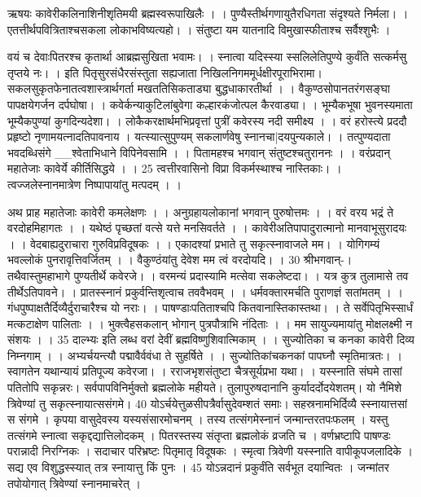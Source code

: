 ऋषयः
कावेरीकलिनाशिनीशृतिमयी ब्रह्मस्वरूपाखिलैः ।
।
 पुण्यैस्तीर्थगणायुतैरधिगता संदृश्यते निर्मला।
 ।
 एतत्तीर्थपवित्रिताश्चसकला लोकाभविष्यत्यहो।
 ।
 संतुष्टा यम यातनादि विमुखास्फीताश्च सर्वैश्शुभैः ।
 
वयं च देवाःपितरश्च कृतार्था आब्रह्मसुखिता भवामः।
।
 स्नात्वा यदिस्स्या स्सलिलेतिपुण्ये
कुर्वंति सत्कर्मसु तृप्तये नः।
।
 इति पितृसुरसंधैरसंस्तुता सह्यजाता
निखिलनिगममूर्धक्षीरपूराभिरामा।
 सकलसुकृतफेनातत्वशास्त्रार्थगर्ता
मखततिसिकताड्या बुद्धधाकारतीर्था ।
।
 वैकुण्ठसोपानतरंगसङ्घा पापक्षयेगर्जन दर्पघोषा।
 ।
 कवेर्कन्याकुटिलांबुवेगा
कल्हारकंजोत्पल कैरवाड्या।
।
 भूम्यैकभूषा भुवनस्यमाता
भूम्यैकपुण्यां कुगदिन्यदेशा।
।
 लोकैकरक्षार्थमभिप्रवृत्तां पुत्रीं कवेरस्य नदी समीक्ष्य ।
 ।
 वरं हरोस्त्ये प्रददौ प्रहृष्टो नृणामयत्नादतिपावनाय ।
 यत्स्यात्सुपुण्यम्
सकलार्णवेषु स्नानचा|दयपुन्यकाले।
।
 तत्पुण्यदाता भवदब्धिसंगे
__श्वेताभिधाने विपिनेवसामि ।
।
 पितामहश्च भगवान् संतुष्टश्चतुराननः ।
 ।
 वरंप्रदान् महातेजाः कावेर्ये कीर्तिसिद्धये ।
 ।
 25 त्वत्तीरवासिनो विप्रा विकर्मस्थाश्च नास्तिकाः।
 ।
 त्वज्जलेस्नानमात्रेण निष्पापायांतु मत्पदम् ।
 ।

अथ प्राह महातेजाः कावेरी कमलेक्षणः ।
।
 अनुग्रहायलोकानां भगवान् पुरुषोत्तमः ।
 ।
 वरं वरय भद्रं ते वरदोहमिहागतः ।
 ।
 यथेष्ठं पृच्छतां वत्से यत्ते मनसिवर्तते ।
 ।
 कावेरीअतिपापादुरात्मानो मानवाभूसुरादयः ।
 ।
 वेदबाह्यदुराचारा गुरुविप्रविदूषकः ।
 ।
 एकादश्यां प्रभाते तु सकृत्स्नावाजले मम।
 ।
 योगिगम्यं भवल्लोकं पुनरावृत्तिवर्जितम् ।
 ।
 वैकुण्ठंयांतु देवेश मम त्वं वरदोयदि।
 ।
 30 श्रीभगवान्-।
 तथैवास्तुमहाभागे पुण्यतीर्थे कवेरजे।
 ।
 वरमन्यं प्रदास्यामि मत्सेवा सकलेष्टदा।
 ।
 यत्र कुत्र तुलामासे तव तीर्थेऽतिपावने।
 ।
 प्रातस्स्नानं प्रकुर्वन्तिशृत्वाच तववैभवम् ।
 ।
 धर्मवक्तारमर्चति पुराणज्ञं सतांमतम् ।
 ।
 गंधपुष्पाक्षतैर्दिव्यैर्दुराचारैश्च यो नराः।
 ।
 पाषण्डाःपतिताश्चपि कितवानास्तिकास्तथा।
 ।
 ते सर्वेपितृभिस्सार्धं मत्कटाक्षेण पालिताः ।
 ।
 भुक्त्वैहसकलान् भोगान् पुत्रपौत्राभि नंदिताः ।
 ।
 मम सायुज्यमायांतु मोक्षलक्ष्मी न संशयः ।
 ।
 35 दाल्भ्यः
इति लब्ध वरां देवीं ब्रह्मविष्णुशिवात्मिकाम् ।
।
 सुज्योतिका च कनका कावेरी दिव्य निम्नगाम् ।
 ।
 अभ्यर्चयन्त्यौ पद्मावैर्ववंधा ते सुहर्षिते ।
 ।
 सुज्योतिकांचकनकां पापघ्नौ स्मृतिमात्रतः।
 ।
 स्वागतेन यथान्यायं प्रतिपूज्य कवेरजा।
 ।
 रराजभृशसंतुष्टा चैत्रसूर्यप्रभा यथा।
 ।
 यस्स्नाति संघमे तासां पतितोपि सकृन्नरः।
 सर्वपापविनिर्मुक्तो ब्रह्मलोके महीयते।
 तुलापुरुषदानानि कुर्यादर्दोदयेशतम्।
 यो नैमिशे त्रिवेण्यां तु सकृत्स्नायात्ससंगमे।
 40 योऽर्चयेत्तुळसीपत्रैर्वासुदेवम्शतं समाः।
 सहस्रनामभिर्दिव्यै स्स्नायात्तसां स संगमे ।
 कृपया वासुदेवस्य यस्यसंसारमोचनम् ।
 तस्य तत्संगमेस्नानं जन्मान्तरतपःफलम् ।
 यस्तु तत्संगमे स्नात्वा सकृद्दद्यात्तिलोदकम् ।
 पितरस्तस्य संतृप्ता ब्रह्मलोकं व्रजति च ।
 वर्णभ्रष्टापि पाषण्डः परान्नादी निरग्निकः ।
 सदाचार परिभ्रष्टः पितृमातृ विदूषकः ।
 स्मृत्वा त्रिवेणी यस्स्नाति वापीकूपजलादिके ।
 सद्य एव विशुद्धस्स्यात् तत्र स्नायात्तु किं पुनः ।
 45 योऽन्नदानं प्रकुर्वंति सर्वभूत दयान्वितः ।
 जन्मांतर तपोयोगात् त्रिवेण्यां स्नानमाचरेत् ।
 
